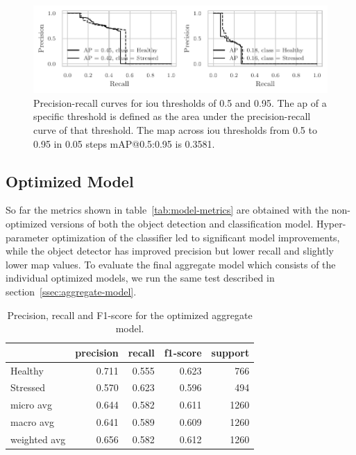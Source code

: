 \documentclass[draft,final]{vutinfth} %
\begin{document}
\begin{figure}
  \centering
  \includegraphics{graphics/APmodel-model-optimized-relabeled.pdf}
  \caption[Aggregate model AP@0.5 and AP@0.95.]{Precision-recall
    curves for \gls{iou} thresholds of 0.5 and 0.95. The \gls{ap} of a
    specific threshold is defined as the area under the
    precision-recall curve of that threshold. The \gls{map} across
    \gls{iou} thresholds from 0.5 to 0.95 in 0.05 steps
    \textsf{mAP}@0.5:0.95 is 0.3581.}
  \label{fig:aggregate-ap}
\end{figure}

\subsection{Optimized Model}
\label{ssec:model-optimized}

So far the metrics shown in table~\ref{tab:model-metrics} are obtained
with the non-optimized versions of both the object detection and
classification model. Hyper-parameter optimization of the classifier
led to significant model improvements, while the object detector has
improved precision but lower recall and slightly lower \gls{map}
values. To evaluate the final aggregate model which consists of the
individual optimized models, we run the same test described in
section~\ref{ssec:aggregate-model}.

\begin{table}
  \centering
  \begin{tabular}{lrrrr}
    \toprule
    {} &  precision &  recall &  f1-score &  support \\
    \midrule
    Healthy      &      0.711 &   0.555 &     0.623 &    766 \\
    Stressed     &      0.570 &   0.623 &     0.596 &    494 \\
    micro avg    &      0.644 &   0.582 &     0.611 &   1260 \\
    macro avg    &      0.641 &   0.589 &     0.609 &   1260 \\
    weighted avg &      0.656 &   0.582 &     0.612 &   1260 \\
    \bottomrule
  \end{tabular}
  \caption{Precision, recall and F1-score for the optimized aggregate
    model.}
  \label{tab:model-metrics-hyp}
\end{table}
\end{document}
